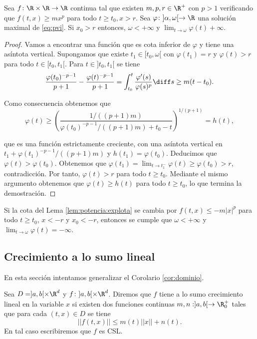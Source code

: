 \documentclass{article}
\begin{document}
\begin{lemma} \label{lem:potencia:explota} Sea $f\colon \R \times \R \to \R$ continua tal que
  existen $m,p, r \in \R^+$ con $p > 1$ verificando que $f(t,x) \ge m x^p$ para todo
  $t \ge t_0, x > r$.  Sea $\varphi \colon ]\alpha, \omega[ \to \R$ una solución maximal de
  \eqref{eq:pvi}. Si $x_0 > r$ entonces, $\omega < +\infty$ y
  $\lim_{t \to \omega} \varphi(t) + \infty$.
\end{lemma}
\begin{proof}
  Vamos a encontrar una función que es cota inferior de $\varphi$ y tiene una asíntota
  vertical. Supongamos que existe $t_1 \in [t_0, \omega[$ con $\varphi(t_1) = r$ y $\varphi(t) > r$
  para todo $t \in [t_0,t_1[$. Para $t \in ]t_0, t_1[$ se tiene
  \[ \frac{\varphi(t_0)^{-p-1}}{p+1} - \frac{\varphi(t)^{-p-1}}{p+1} = \int_{t_0}^t
    \frac{\varphi'(s)}{\varphi(s)^p} \diff s \ge m(t-t_0).\]

  Como consecuencia obtenemos que
  \[ \varphi(t) \ge \left( \frac{1/((p+1)m)}{\varphi(t_0)^{-p-1}/((p+1)m) + t_0 -
        t}\right)^{1/(p+1)} = h(t), \]

  que es una función estrictamente creciente, con una asíntota vertical en
  $t_1 + \varphi(t_1)^{-p-1}/((p+1)m)$ y $h(t_1) = \varphi(t_0)$. Deducimos que
  $\varphi(t) > \varphi(t_0)$. Obtenemos que
  $\varphi(t_1) = \lim_{t \to t_1^-} \varphi(t) \ge \varphi(t_0) > r$, contradicción. Por tanto,
  $\varphi(t) > r$ para todo $t \ge t_0$.  Mediante el mismo argumento obtenemos que
  $\varphi(t) \ge h(t)$ para todo $t \ge t_0$, lo que termina la demostración.
\end{proof}

\begin{remark}
  Si la cota del Lema \ref{lem:potencia:explota} se cambia por $f(t,x) \le -m |x|^p$ para todo
  $t \ge t_0$, $x < -r$ y $x_0 < -r$, entonces se cumple que $\omega < +\infty$ y
  $\lim_{t \to \omega} \varphi(t) = - \infty$.
\end{remark}


\subsection{Crecimiento a lo sumo lineal}

En esta sección intentamos generalizar el Corolario \ref{cor:dominio}.

\begin{definition}
  Sea $D = ]a,b[ \times \R^d$ y $f \colon ]a,b[\times\R^d$. Diremos que $f$ tiene a lo sumo
  crecimiento lineal en la variable $x$ si existen dos funciones continuas $m, n : ]a,b[ \to \R^+_0$
  tales que para cada $(t,x) \in D$ se tiene
  \[ ||f(t,x)|| \le m(t) ||x|| + n(t).\] En tal caso escribiremos que $f$ es CSL.
\end{definition}
\end{document}
